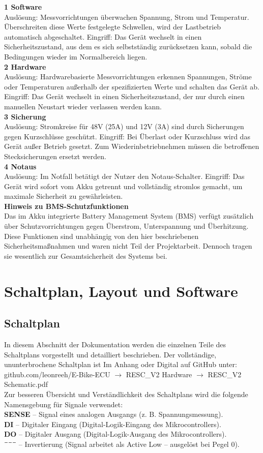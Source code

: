 \documentclass[paper=a4,11pt]{scrreprt}
\begin{document}
\textbf{1 Software}\\
Auslösung: Messvorrichtungen überwachen Spannung, Strom und Temperatur. Überschreiten diese Werte festgelegte Schwellen, wird der Lastbetrieb automatisch abgeschaltet.
Eingriff: Das Gerät wechselt in einen Sicherheitszustand, aus dem es sich selbstständig zurücksetzen kann, sobald die Bedingungen wieder im Normalbereich liegen.\\
\textbf{2 Hardware}\\
Auslösung: Hardwarebasierte Messvorrichtungen erkennen Spannungen, Ströme oder Temperaturen außerhalb der spezifizierten Werte und schalten das Gerät ab.
Eingriff: Das Gerät wechselt in einen Sicherheitszustand, der nur durch einen manuellen Neustart wieder verlassen werden kann.\\
\textbf{3 Sicherung}\\
Auslösung: Stromkreise für 48V (25A) und 12V (3A) sind durch Sicherungen gegen Kurzschlüsse geschützt.
Eingriff: Bei Überlast oder Kurzschluss wird das Gerät außer Betrieb gesetzt. Zum Wiederinbetriebnehmen müssen die betroffenen Stecksicherungen ersetzt werden.\\
\textbf{4 Notaus}\\
Auslösung: Im Notfall betätigt der Nutzer den Notaus-Schalter.
Eingriff: Das Gerät wird sofort vom Akku getrennt und vollständig stromlos gemacht, um maximale Sicherheit zu gewährleisten.\\
\textbf{Hinweis zu BMS-Schutzfunktionen}\\
Das im Akku integrierte Battery Management System (BMS) verfügt zusätzlich über Schutzvorrichtungen gegen Überstrom, Unterspannung und Überhitzung. Diese Funktionen sind unabhängig von den hier beschriebenen Sicherheitsmaßnahmen und waren nicht Teil der Projektarbeit. Dennoch tragen sie wesentlich zur Gesamtsicherheit des Systems bei.

\part{Schaltplan, Layout und Software}
\chapter{Schaltplan}
In diesem Abschnitt der Dokumentation werden die einzelnen Teile des Schaltplans vorgestellt und detailliert beschrieben. Der vollständige, ununterbrochene Schaltplan ist Im Anhang oder Digital auf GitHub unter: github.com/leonreeh/E-Bike-ECU $\rightarrow$ RESC\_V2 Hardware $\rightarrow$ RESC\_V2 Schematic.pdf\\
Zur besseren Übersicht und Verständlichkeit des Schaltplans wird die folgende Namensgebung für Signale verwendet:\\
\textbf{SENSE} – Signal eines analogen Ausgangs (z. B. Spannungsmessung).\\
\textbf{DI} – Digitaler Eingang (Digital-Logik-Eingang des Mikrocontrollers).\\
\textbf{DO} – Digitaler Ausgang (Digital-Logik-Ausgang des Mikrocontrollers).\\
\textbf{¯¯¯} – Invertierung (Signal arbeitet als Active Low – ausgelöst bei Pegel 0).
\end{document}
